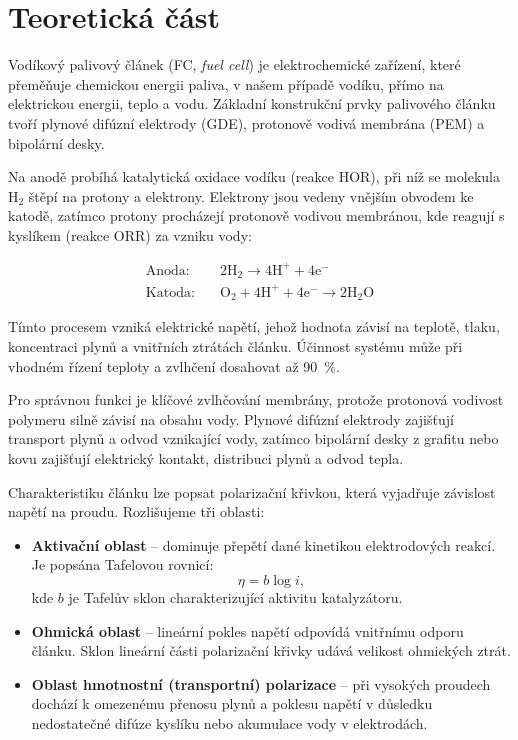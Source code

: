 \section{Teoretická část}

Vodíkový palivový článek (FC, \textit{fuel cell}) je elektrochemické zařízení, které přeměňuje chemickou energii paliva, v našem případě vodíku, přímo na elektrickou energii, teplo a vodu. Základní konstrukční prvky palivového článku tvoří plynové difúzní elektrody (GDE), protonově vodivá membrána (PEM) a bipolární desky. 

Na anodě probíhá katalytická oxidace vodíku (reakce HOR), při níž se molekula $\mathrm{H_2}$ štěpí na protony a elektrony. Elektrony jsou vedeny vnějším obvodem ke katodě, zatímco protony procházejí protonově vodivou membránou, kde reagují s kyslíkem (reakce ORR) za vzniku vody:

\begin{align}
\text{Anoda:} & \quad \mathrm{2H_2 \rightarrow 4H^+ + 4e^-} \\
\text{Katoda:} & \quad \mathrm{O_2 + 4H^+ + 4e^- \rightarrow 2H_2O}
\end{align}

Tímto procesem vzniká elektrické napětí, jehož hodnota závisí na teplotě, tlaku, koncentraci plynů a vnitřních ztrátách článku. Účinnost systému může při vhodném řízení teploty a zvlhčení dosahovat až 90~\%.

Pro správnou funkci je klíčové zvlhčování membrány, protože protonová vodivost polymeru silně závisí na obsahu vody. Plynové difúzní elektrody zajišťují transport plynů a odvod vznikající vody, zatímco bipolární desky z grafitu nebo kovu zajišťují elektrický kontakt, distribuci plynů a odvod tepla.

Charakteristiku článku lze popsat polarizační křivkou, která vyjadřuje závislost napětí na proudu. Rozlišujeme tři oblasti:

\begin{itemize}
    \item \textbf{Aktivační oblast} -- dominuje přepětí dané kinetikou elektrodových reakcí. Je popsána Tafelovou rovnicí:
    \begin{equation}
    \eta = b \log i,
    \end{equation}
    kde $b$ je Tafelův sklon charakterizující aktivitu katalyzátoru.

    \item \textbf{Ohmická oblast} -- lineární pokles napětí odpovídá vnitřnímu odporu článku. Sklon lineární části polarizační křivky udává velikost ohmických ztrát.

    \item \textbf{Oblast hmotnostní (transportní) polarizace} -- při vysokých proudech dochází k omezenému přenosu plynů a poklesu napětí v důsledku nedostatečné difúze kyslíku nebo akumulace vody v elektrodách.
\end{itemize}

